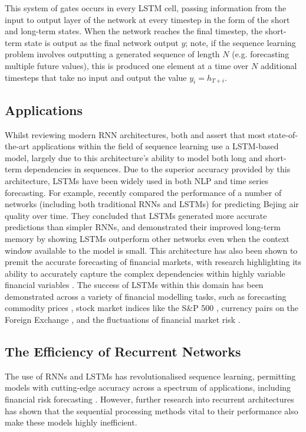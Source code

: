 \documentclass[a4paper, 11pt]{report}
\begin{document}
    This system of gates occurs in every LSTM cell, passing information from the input to output layer of the network at every timestep in the form of the short and long-term states. When the network reaches the final timestep, the short-term state is output as the final network output $y$; note, if the sequence learning problem involves outputting a generated sequence of length $N$ (e.g. forecasting multiple future values), this is produced one element at a time over $N$ additional timesteps that take no input and output the value $y_i = h_{T+i}$.


    \subsection{Applications}

    Whilst reviewing modern RNN architectures, both \citet{lipton-2015} and \citet{yu-2019} assert that most state-of-the-art applications within the field of sequence learning use a LSTM-based model, largely due to this architecture's ability to model both long and short-term dependencies in sequences. Due to the superior accuracy provided by this architecture, LSTMs have been widely used in both NLP and time series forecasting. For example, \citet{shi-2022} recently compared the performance of a number of networks (including both traditional RNNs and LSTMs) for predicting Bejing air quality over time. They concluded that LSTMs generated more accurate predictions than simpler RNNs, and demonstrated their improved long-term memory by showing LSTMs outperform other networks even when the context window available to the model is small. This architecture has also been shown to premit the accurate forecasting of financial markets, with research highlighting its ability to accurately capture the complex dependencies within highly variable financial variables \citep{li-2017}. The success of LSTMs within this domain has been demonstrated across a variety of financial modelling tasks, such as forecasting commodity prices \citep{ly-2021}, stock market indices like the S\&P 500 \citep{fjellstrom-2022}, currency pairs on the Foreign Exchange \citep{qi-2021}, and the fluctuations of financial market risk \citep{du-2019}.


    \subsection{The Efficiency of Recurrent Networks}

    The use of RNNs and LSTMs has revolutionalised sequence learning, permitting models with cutting-edge accuracy across a spectrum of applications, including financial risk forecasting \citep{du-2019}. However, further research into recurrent architectures has shown that the sequential processing methods vital to their performance also make these models highly inefficient.
\end{document}
